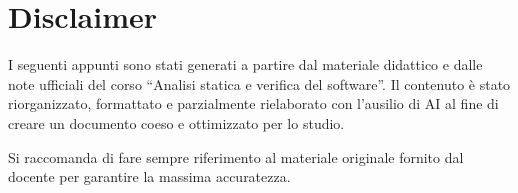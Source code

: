 \documentclass{article}
\begin{document}
\maketitle

\tableofcontents

\section*{Disclaimer}

\vfill
\begin{nota*}{}
I seguenti appunti sono stati generati a partire dal materiale
didattico e dalle note ufficiali del corso ``Analisi statica e verifica del
software''.
Il contenuto è stato riorganizzato, formattato e parzialmente rielaborato con
l'ausilio di AI al fine di creare un documento coeso e ottimizzato per lo studio.

\medskip

Si raccomanda di fare sempre riferimento al materiale originale fornito dal
docente per garantire la massima accuratezza.
\end{nota*}
\vfill















\end{document}
